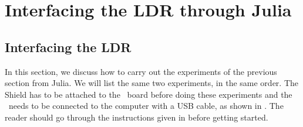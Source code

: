 \section{Interfacing the LDR through Julia}
\subsection{Interfacing the LDR}
In this section, we discuss how to carry out the experiments of the
previous section from Julia.  We will list the same two experiments,
in the same order.  The Shield has to be attached to the \arduino\ board
before doing these experiments and the \arduino\ needs to be connected to the computer 
with a USB cable, as shown in .
The reader should go through the instructions given in  before getting started.



